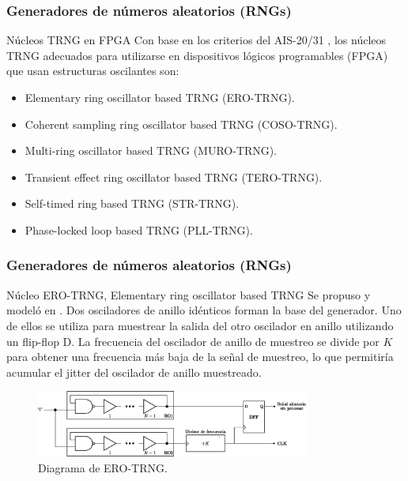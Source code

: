 \documentclass[10pt]{beamer}
\begin{document}
\begin{frame}
    \frametitle{Generadores de números aleatorios (RNGs)}
    \begin{block}{Núcleos TRNG en FPGA}
        \justifying
        Con base en los criterios del AIS-20/31 \cite{Petura2016}, los núcleos TRNG adecuados para utilizarse en dispositivos lógicos programables (FPGA) que usan estructuras oscilantes son:
		\begin{itemize}
            \item Elementary ring oscillator based TRNG (ERO-TRNG).
            \item Coherent sampling ring oscillator based TRNG (COSO-TRNG).
            \item Multi-ring oscillator based TRNG (MURO-TRNG).
            \item Transient effect ring oscillator based TRNG (TERO-TRNG).
            \item Self-timed ring based TRNG  (STR-TRNG).
            \item Phase-locked loop based TRNG (PLL-TRNG).
        \end{itemize}  
	\end{block}
\end{frame}


\begin{frame}
    \frametitle{Generadores de números aleatorios (RNGs)}
    \begin{block}{Núcleo ERO-TRNG, Elementary ring oscillator based TRNG}
        \justifying
         Se propuso y modeló en \cite{Baudet2010}. Dos osciladores de anillo idénticos forman la base del generador. Uno de ellos se utiliza para muestrear la salida del otro oscilador en anillo utilizando un flip-flop D. La frecuencia del oscilador de anillo de muestreo se divide por $K$ para obtener una frecuencia más baja de la señal de muestreo, lo que permitiría acumular el jitter del oscilador de anillo muestreado.
	\end{block}
	\begin{figure}[hbtp]
	    \centering
	    \includegraphics[width=0.8\textwidth]{A1_ERO_TRNG}
	    \caption{Diagrama de ERO-TRNG.}
        \label{fig:A1_ERO_TRNG}
    \end{figure}
\end{frame}
\end{document}
